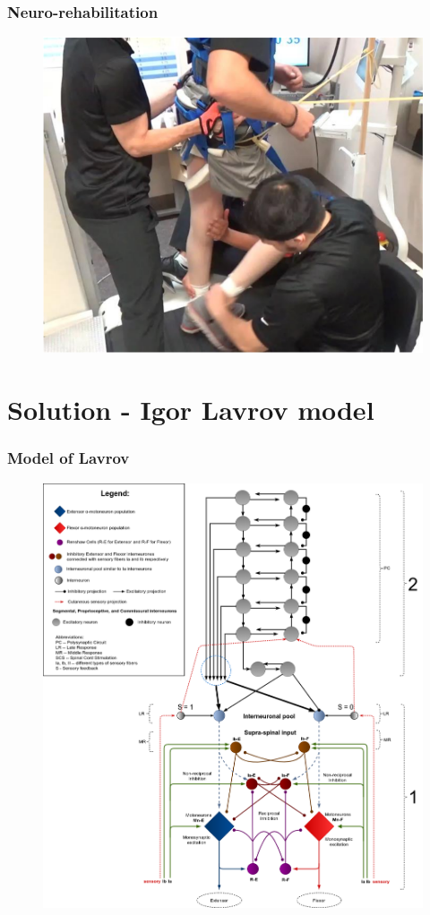 \documentclass[12pt, aspectratio=169]{beamer}
\begin{document}
\begin{frame}
  \frametitle{Neuro-rehabilitation}
  \begin{figure}
    \includegraphics[width=0.5\linewidth]{neurorehabilitation}
  \end{figure}
\end{frame}

\section{Solution - Igor Lavrov model}
\begin{frame}
  \frametitle{Model of Lavrov}
  \begin{figure}
    \includegraphics[width=0.48\linewidth]{spinal-cord-diagram}
  \end{figure}
\end{frame}
\end{document}
